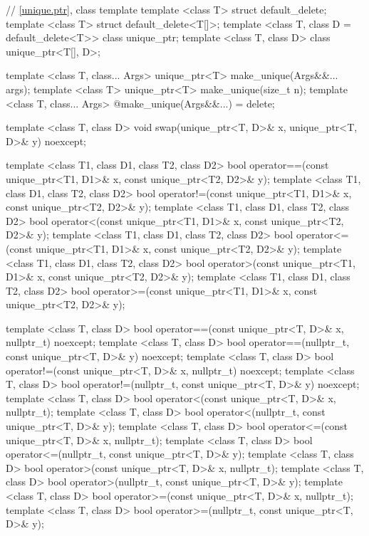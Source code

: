 \begin{codeblock}
{  // \ref{unique.ptr}, class template 
  template <class T> struct default_delete;
  template <class T> struct default_delete<T[]>;
  template <class T, class D = default_delete<T>> class unique_ptr;
  template <class T, class D> class unique_ptr<T[], D>;

  template <class T, class... Args> unique_ptr<T> make_unique(Args&&... args);
  template <class T> unique_ptr<T> make_unique(size_t n);
  template <class T, class... Args> @\unspec@ make_unique(Args&&...) = delete;

  template <class T, class D> void swap(unique_ptr<T, D>& x, unique_ptr<T, D>& y) noexcept;

  template <class T1, class D1, class T2, class D2>
    bool operator==(const unique_ptr<T1, D1>& x, const unique_ptr<T2, D2>& y);
  template <class T1, class D1, class T2, class D2>
    bool operator!=(const unique_ptr<T1, D1>& x, const unique_ptr<T2, D2>& y);
  template <class T1, class D1, class T2, class D2>
    bool operator<(const unique_ptr<T1, D1>& x, const unique_ptr<T2, D2>& y);
  template <class T1, class D1, class T2, class D2>
    bool operator<=(const unique_ptr<T1, D1>& x, const unique_ptr<T2, D2>& y);
  template <class T1, class D1, class T2, class D2>
    bool operator>(const unique_ptr<T1, D1>& x, const unique_ptr<T2, D2>& y);
  template <class T1, class D1, class T2, class D2>
    bool operator>=(const unique_ptr<T1, D1>& x, const unique_ptr<T2, D2>& y);

  template <class T, class D>
    bool operator==(const unique_ptr<T, D>& x, nullptr_t) noexcept;
  template <class T, class D>
    bool operator==(nullptr_t, const unique_ptr<T, D>& y) noexcept;
  template <class T, class D>
    bool operator!=(const unique_ptr<T, D>& x, nullptr_t) noexcept;
  template <class T, class D>
    bool operator!=(nullptr_t, const unique_ptr<T, D>& y) noexcept;
  template <class T, class D>
    bool operator<(const unique_ptr<T, D>& x, nullptr_t);
  template <class T, class D>
    bool operator<(nullptr_t, const unique_ptr<T, D>& y);
  template <class T, class D>
    bool operator<=(const unique_ptr<T, D>& x, nullptr_t);
  template <class T, class D>
    bool operator<=(nullptr_t, const unique_ptr<T, D>& y);
  template <class T, class D>
    bool operator>(const unique_ptr<T, D>& x, nullptr_t);
  template <class T, class D>
    bool operator>(nullptr_t, const unique_ptr<T, D>& y);
  template <class T, class D>
    bool operator>=(const unique_ptr<T, D>& x, nullptr_t);
  template <class T, class D>
    bool operator>=(nullptr_t, const unique_ptr<T, D>& y);

}
\end{codeblock}
